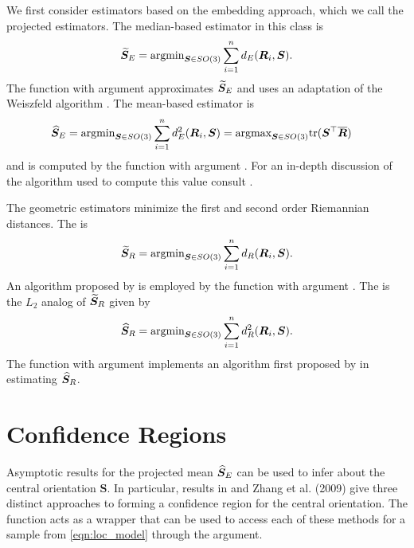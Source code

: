 We first consider estimators based on the embedding approach, which we call the projected estimators.  The median-based estimator in this class is
\begin{equation}\label{est:med}
\widetilde{\bm S}_E=\text{argmin}_{\bm{S}\in
SO(3)}\sum_{i=1}^nd_E(\bm{R}_i,\bm{S}).
\end{equation}
The function  with argument  approximates $\widetilde{\bm S}_E$ and uses an adaptation of the Weiszfeld algorithm \citep{weiszfeld1937}.  The mean-based estimator is 
\begin{align}\label{est:pam}
\widehat{\bm S}_E&=\text{argmin}_{\bm{S}\in
SO(3)}\sum_{i=1}^nd_E^2(\bm{R}_i,\bm{S})\nonumber=\text{argmax}_{\bm{S}\in
SO(3)}\text{tr}(\bm{S}^{\top}\overline{\bm{R}})
\end{align}
and is computed by the function  with argument .  For an in-depth discussion of the algorithm used to compute this value consult \citet{moakher2002}.

The geometric estimators minimize the first and second order Riemannian distances.  The  is 
\begin{equation}\label{est:lone}
\widetilde{\bm S}_R=\text{argmin}_{\bm{S}\in
SO(3)}\sum_{i=1}^nd_R(\bm{R}_i,\bm{S}).
\end{equation}
An algorithm proposed by \citet{hartley2011} is employed by the function  with argument .  The  is the $L_2$ analog of $\widetilde{\bm S}_R$ given by 
\begin{equation}\label{est:ltwo}
\widehat{\bm S}_R=\text{argmin}_{\bm{S}\in
SO(3)}\sum_{i=1}^nd_R^2(\bm{R}_i,\bm{S}).
\end{equation}
The function  with argument  implements an algorithm first proposed by \citet{manton2004} in estimating $\widehat{\bm S}_R$.

\section{Confidence Regions}

Asymptotic results for the projected mean $\widehat{\bm S}_E$ can be used to infer about the central orientation $\bm S$. In particular, results in \cite{prentice1986,chang2001} and Zhang et al. (2009) give three distinct approaches to forming a confidence region for the central orientation.  The  function acts as a wrapper that can be used to access each of these methods for a sample from \eqref{eqn:loc_model} through the  argument.


